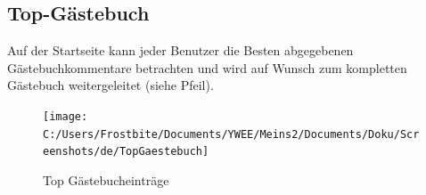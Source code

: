 \newpage

\subsection{Top-Gästebuch}

Auf der Startseite kann jeder Benutzer die Besten abgegebenen Gästebuchkommentare betrachten und wird auf Wunsch zum kompletten Gästebuch weitergeleitet (siehe Pfeil).

\begin{figure}[!htbp]
\centering
\texttt{[image: C:/Users/Frostbite/Documents/YWEE/Meins2/Documents/Doku/Screenshots/de/TopGaestebuch]}
\caption{Top Gästebucheinträge}
\label{fig:TopGaestebuch}
\end{figure}
